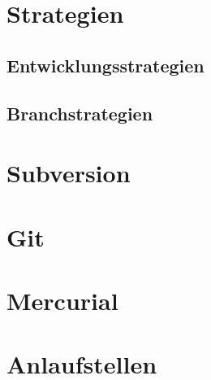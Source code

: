 \documentclass[presentation]{beamer}
\begin{document}
\section{Strategien}
\subsection{Entwicklungsstrategien}

\subsection{Branchstrategien}

\section{Subversion}
\section{Git}
\section{Mercurial}

\section{Anlaufstellen}
\end{document}
